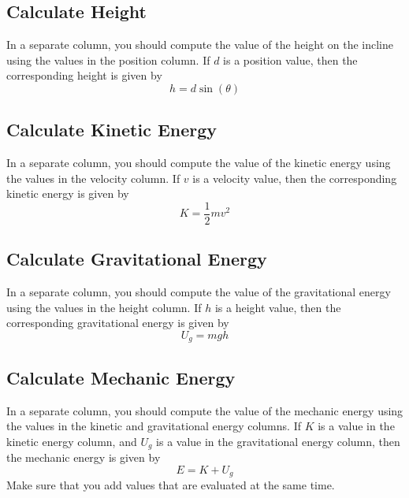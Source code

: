 \subsection{Calculate Height}
In a separate column, you should compute the value of the height on the incline using the values in the position column. If $d$ is a position value, then the corresponding height is given by
\begin{equation}
    h = d \sin(\theta)
\end{equation}
\subsection{Calculate Kinetic Energy}
In a separate column, you should compute the value of the kinetic energy using the values in the velocity column. If $v$ is a velocity value, then the corresponding kinetic energy is given by
\begin{equation}
    K = \frac{1}{2} m v^{2}
\end{equation}
\subsection{Calculate Gravitational Energy}
In a separate column, you should compute the value of the gravitational energy using the values in the height column. If $h$ is a height value, then the corresponding gravitational energy is given by
\begin{equation}
    U_{g} = m g h
\end{equation}
\subsection{Calculate Mechanic Energy}
In a separate column, you should compute the value of the mechanic energy using the values in the kinetic and gravitational energy columns. If $K$ is a value in the kinetic energy column, and $U_{g}$ is a value in the gravitational energy column, then the mechanic energy is given by
\begin{equation}
    E = K + U_{g}
\end{equation}
Make sure that you add values that are evaluated at the same time.

